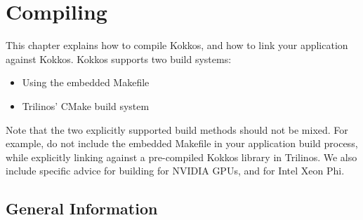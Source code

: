 
\chapter{Compiling}\label{C:build}

This chapter explains how to compile Kokkos, and how to link your
application against Kokkos.  Kokkos supports two build systems:
\begin{itemize}
\item Using the embedded Makefile
\item Trilinos' CMake build system
\end{itemize}
Note that the two explicitly supported build methods should not be
mixed.  For example, do not include the embedded Makefile in your
application build process, while explicitly linking against a
pre-compiled Kokkos library in Trilinos.  We also include specific
advice for building for NVIDIA GPUs, and for Intel Xeon Phi.

\section{General Information}\label{S:build:gen}

